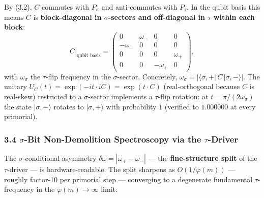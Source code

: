 \documentclass[
]{article}
\begin{document}
By (3.2), \(C\) commutes with \(P_\sigma\) and anti-commutes with
\(P_\tau\). In the qubit basis this means \(C\) is
\textbf{block-diagonal in \(\sigma\)-sectors and off-diagonal in
\(\tau\) within each block}:
\[C \big|_{\text{qubit basis}} = \begin{pmatrix}
0 & \omega_- & 0 & 0 \\
-\omega_- & 0 & 0 & 0 \\
0 & 0 & 0 & \omega_+ \\
0 & 0 & -\omega_+ & 0
\end{pmatrix}, \tag{3.4}\] with \(\omega_\sigma\) the \(\tau\)-flip
frequency in the \(\sigma\)-sector. Concretely,
\(\omega_\sigma = |\langle \sigma, +|\, C\, |\sigma, -\rangle|\). The
unitary \(U_C(t) = \exp(-it \cdot iC) = \exp(t \cdot C)\)
(real-orthogonal because \(C\) is real-skew) restricted to a
\(\sigma\)-sector implements a \(\tau\)-flip rotation: at
\(t = \pi / (2 \omega_\sigma)\) the state \(|\sigma, -\rangle\) rotates
to \(|\sigma, +\rangle\) with probability \(1\) (verified to
\(1.000000\) at every primorial).

\subsubsection{\texorpdfstring{3.4 \(\sigma\)-Bit Non-Demolition
Spectroscopy via the
\(\tau\)-Driver}{3.4 \textbackslash sigma-Bit Non-Demolition Spectroscopy via the \textbackslash tau-Driver}}\label{sigma-bit-non-demolition-spectroscopy-via-the-tau-driver}

The \(\sigma\)-conditional asymmetry
\(\delta\omega = |\omega_+ - \omega_-|\) --- the \textbf{fine-structure
split} of the \(\tau\)-driver --- is hardware-readable. The split
sharpens as \(O(1/\varphi(m))\) --- roughly factor-10 per primorial step
--- converging to a degenerate fundamental \(\tau\)-frequency in the
\(\varphi(m) \to \infty\) limit:
\end{document}
